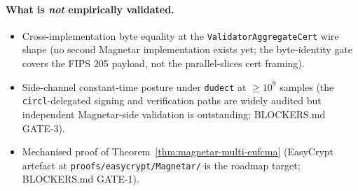 \paragraph{What is \emph{not} empirically validated.}
\begin{itemize}[leftmargin=2em,nosep]
  \item Cross-implementation byte equality at the
        \texttt{ValidatorAggregateCert} wire shape (no second
        Magnetar implementation exists yet; the byte-identity
        gate covers the FIPS 205 payload, not the
        parallel-slices cert framing).
  \item Side-channel constant-time posture under \texttt{dudect}
        at $\ge 10^9$ samples (the \texttt{circl}-delegated
        signing and verification paths are widely audited but
        independent Magnetar-side validation is outstanding;
        BLOCKERS.md GATE-3).
  \item Mechanised proof of
        Theorem~\ref{thm:magnetar-multi-eufcma} (EasyCrypt
        artefact at \texttt{proofs/easycrypt/Magnetar/} is the
        roadmap target; BLOCKERS.md GATE-1).
\end{itemize}
